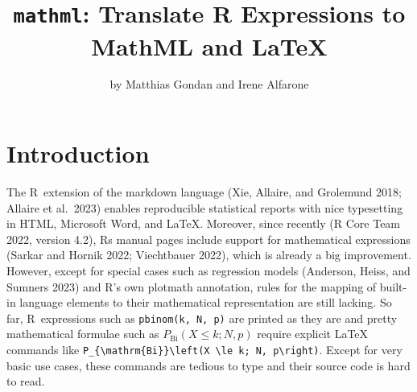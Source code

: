 \title{\texttt{mathml}: Translate R Expressions to MathML and LaTeX}


\author{by Matthias Gondan and Irene Alfarone}

\maketitle


\hypertarget{introduction}{%
\section{Introduction}\label{introduction}}

The R~extension of the markdown language (Xie, Allaire, and Grolemund
2018; Allaire et al.~2023) enables reproducible statistical reports with
nice typesetting in HTML, Microsoft Word, and LaTeX. Moreover, since
recently (R Core Team 2022, version 4.2), Rs manual pages include
support for mathematical expressions (Sarkar and Hornik 2022;
Viechtbauer 2022), which is already a big improvement. However, except
for special cases such as regression models (Anderson, Heiss, and
Sumners 2023) and R's own plotmath annotation, rules for the mapping of
built-in language elements to their mathematical representation are
still lacking. So far, R~expressions such as \texttt{pbinom(k,~N,~p)} are
printed as they are and pretty mathematical formulae such as
\(P_{\mathrm{Bi}}(X \le k; N, p)\) require explicit LaTeX commands like
\texttt{P\_\{\textbackslash{}mathrm\{Bi\}\}\textbackslash{}left(X~\textbackslash{}le~k;~N,~p\textbackslash{}right)}. Except for very basic use
cases, these commands are tedious to type and their source code is hard
to read.

